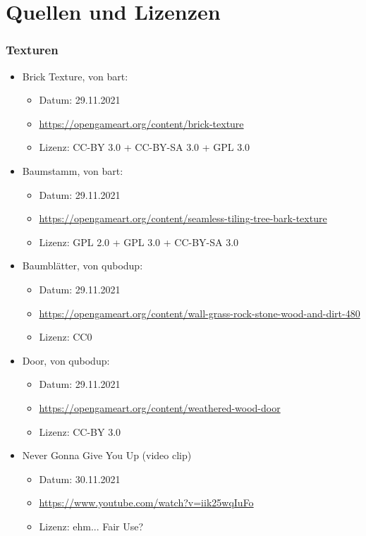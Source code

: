 \documentclass{article}
\begin{document}
\newpage 

\section*{Quellen und Lizenzen}
\subsubsection*{Texturen}
\begin{itemize}
    \item Brick Texture, von bart:
        \begin{itemize}
            \item Datum: 29.11.2021
            \item \url{https://opengameart.org/content/brick-texture}
            \item Lizenz: CC-BY 3.0 + CC-BY-SA 3.0 + GPL 3.0
        \end{itemize}
    \item Baumstamm, von bart:
        \begin{itemize}
            \item Datum: 29.11.2021
            \item \url{https://opengameart.org/content/seamless-tiling-tree-bark-texture}
            \item Lizenz: GPL 2.0 + GPL 3.0 + CC-BY-SA 3.0
        \end{itemize}
    \item Baumblätter, von qubodup:
        \begin{itemize}
            \item Datum: 29.11.2021
            \item \url{https://opengameart.org/content/wall-grass-rock-stone-wood-and-dirt-480}
            \item Lizenz: CC0
        \end{itemize}
    \item Door, von qubodup:
        \begin{itemize}
            \item Datum: 29.11.2021
            \item \url{https://opengameart.org/content/weathered-wood-door}
            \item Lizenz: CC-BY 3.0
        \end{itemize}
    \item Never Gonna Give You Up (video clip)
        \begin{itemize}
            \item Datum: 30.11.2021
            \item \url{https://www.youtube.com/watch?v=iik25wqIuFo}
            \item Lizenz: ehm... Fair Use?
        \end{itemize}
\end{itemize}
\end{document}
